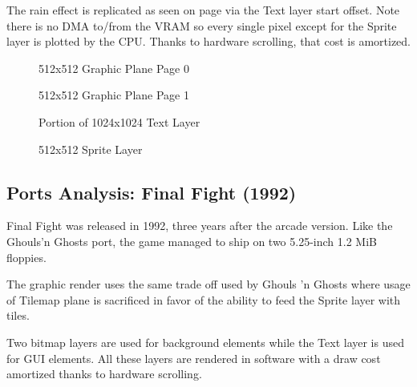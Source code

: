 The rain effect is replicated as seen on page \pageref{gg_rain} via the Text layer start offset. Note there is no DMA to/from the VRAM so every single pixel except for the Sprite layer is plotted by the CPU. Thanks to hardware scrolling, that cost is amortized.

\vspace{-4ex}
\begin{minipage}[t]{0.49\linewidth}
  \begin{figure}[H]
  \caption*{512x512 Graphic Plane Page 0}
  \end{figure}
\end{minipage}%
\hfill
\begin{minipage}[t]{0.49\linewidth}
  \begin{figure}[H]
  \caption*{512x512 Graphic Plane Page 1}
  \end{figure}
\end{minipage}%

\begin{minipage}[t]{0.49\linewidth}
  \begin{figure}[H]
  \caption*{Portion of 1024x1024 Text Layer}
  \end{figure}
\end{minipage}%
\hfill
\begin{minipage}[t]{0.49\linewidth}
   \begin{figure}[H]
  \caption*{512x512 Sprite Layer}
  \end{figure}
\end{minipage}%


\pagebreak

\subsection{Ports Analysis: Final Fight (1992)}

Final Fight was released in 1992, three years after the arcade version. Like the Ghouls'n Ghosts port, the game managed to ship on two 5.25-inch 1.2 MiB floppies.

The graphic render uses the same trade off used by Ghouls 'n Ghosts where usage of Tilemap plane is sacrificed in favor of the ability to feed the Sprite layer with tiles. 

Two bitmap layers are used for background elements while the Text layer is used for GUI elements. All these layers are rendered in software with a draw cost amortized thanks to hardware scrolling.

